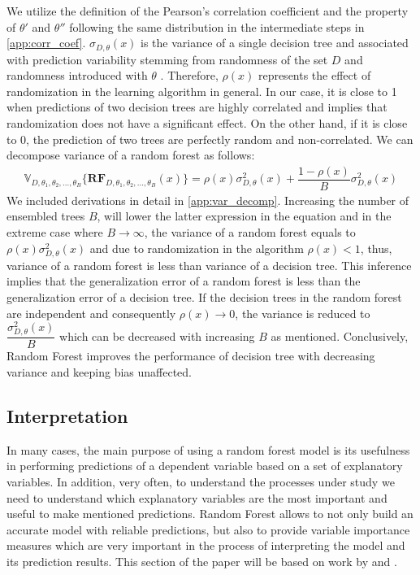 We utilize the definition of the Pearson's correlation coefficient and the property of $\theta'$ and $\theta''$ following 
the same distribution in the intermediate steps in \autoref{app:corr_coef}. 
$\sigma_{D, \theta}(x)$ is the variance of a single decision tree and 
associated with prediction variability stemming from randomness of the set $D$ 
and randomness introduced with $\theta$ \cite{louppe2014understanding}.
Therefore, $\rho(x)$ represents the effect of randomization in the learning algorithm in general.
In our case, it is close to 1 when predictions of two decision trees are highly correlated and implies that randomization 
does not have a significant effect. On the other hand, if it is close to 0, the prediction of two trees are perfectly random 
and non-correlated. We can decompose variance of a random forest as follows:
\begin{align}\label{eq:decomp_var}
\mathbb{V}_{D, \theta_{1}, \theta_{2},..., \theta_{B}}\{\boldsymbol{RF}_{D, \theta_{1},\theta_{2},..., \theta_{B}}(x) \}  = \rho(x)\sigma^2_{D,\theta}(x) + \dfrac{1-\rho(x)}{B}\sigma^2_{D,\theta}(x)
\end{align}
We included derivations in detail in \autoref{app:var_decomp}. 
Increasing the number of ensembled trees $B$, will lower the latter expression in the equation and in the extreme 
case where $B \rightarrow \infty $, the variance of a random forest equals to $\rho(x)\sigma^2_{D,\theta}(x)$ 
and due to randomization in the algorithm $\rho(x) < 1$, 
thus, variance of a random forest is less than variance of a decision tree. 
This inference implies that the generalization error of a random forest is less than the generalization error of a decision tree. 
If the decision trees in the random forest are independent 
and consequently $\rho(x) \rightarrow 0$, the variance is reduced to $\dfrac{\sigma^2_{D,\theta}(x)}{B}$ 
which can be decreased with increasing $B$ as mentioned. 
Conclusively, Random Forest improves the performance of decision tree with decreasing variance and keeping bias unaffected.

\subsection{Interpretation}
In many cases, the main purpose of using a random forest model is its usefulness in performing predictions of a dependent variable
based on a set of explanatory variables. In addition, very often, to understand the processes under study we need to understand
which explanatory variables are the most important and useful to make mentioned predictions. 
Random Forest allows to not only build an accurate model with reliable predictions, 
but also to provide variable importance measures which are very important in the process of interpreting the model and 
its prediction results. This section of the paper will be based on work by \cite{louppe2013understanding} 
and \cite{gerard2016foresttour}.

